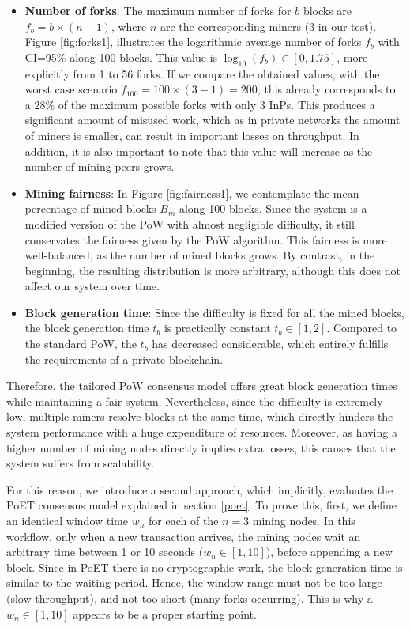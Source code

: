 \begin{itemize}
\item \textbf{Number of forks}: The maximum number of forks for $b$ blocks are $f_b = b \times (n-1)$, where $n$ are the corresponding miners (3 in our test). Figure \ref{fig:forks1}, illustrates the logarithmic average number of forks $f_b$ with CI=95\% along 100 blocks. This value is $\log_{10}(f_b) \in [0,1.75]$, more explicitly from 1 to 56 forks. If we compare the obtained values, with the worst case scenario $f_{100} = 100 \times (3-1) = 200$, this already corresponds to a 28\% of the maximum possible forks with only 3 InPs. This produces a significant amount of misused work, which as in private networks the amount of miners is smaller, can result in important losses on throughput. In addition, it is also important to note that this value will increase as the number of mining peers grows.
\item \textbf{Mining fairness}: In Figure \ref{fig:fairness1}, we contemplate the mean percentage of mined blocks $B_m$ along 100 blocks. Since the system is a modified version of the PoW with almost negligible difficulty, it still conservates the fairness given by the PoW algorithm. This fairness is more well-balanced, as the number of mined blocks grows. By contrast, in the beginning, the resulting distribution is more arbitrary, although this does not affect our system over time.
\item \textbf{Block generation time}: Since the difficulty is fixed for all the mined blocks, the block generation time $t_b$ is practically constant $t_b \in [1,2]$. Compared to the standard PoW, the $t_b$ has decreased considerable, which entirely fulfills the requirements of a private blockchain.
 
\end{itemize}

Therefore, the tailored PoW consensus model offers great block generation times while maintaining a fair system. Nevertheless, since the difficulty is extremely low, multiple miners resolve blocks at the same time, which directly hinders the system performance with a huge expenditure of resources. Moreover, as having a higher number of mining nodes directly implies extra losses, this causes that the system suffers from scalability. 

For this reason, we introduce a second approach, which implicitly, evaluates the PoET consensus model explained in section \ref{poet}. To prove this, first, we define an identical window time $w_n$ for each of the $n = 3$ mining nodes. In this workflow, only when a new transaction arrives, the mining nodes wait an arbitrary time between 1 or 10 seconds ($w_n \in [1,10]$), before appending a new block. Since in PoET there is no cryptographic work, the block generation time is similar to the waiting period. Hence, the window range must not be too large (slow throughput), and not too short (many forks occurring). This is why a $w_n \in [1,10]$ appears to be a proper starting point. 

